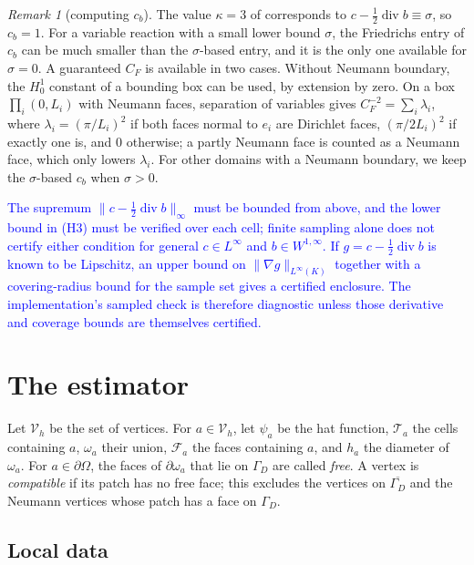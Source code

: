 \documentclass[11pt]{article}
\newcommand{\rev}[1]{\textcolor{blue}{#1}}
\newcommand{\dv}{\operatorname{div}}
\theoremstyle{plain}
\theoremstyle{remark}
\newtheorem{remark}[theorem]{Remark}
\numberwithin{equation}{section}
\begin{document}
\begin{remark}[computing $c_b$]\label{rem:CF}
The value $\kappa=3$ of \cite{EM16} corresponds to $c-\frac12\dv b\equiv\sigma$, so $c_b=1$. For a
variable reaction with a small lower bound $\sigma$, the Friedrichs entry of $c_b$ can be much smaller
than the $\sigma$-based entry, and it is the only one available for $\sigma=0$. A guaranteed $C_F$ is
available in two cases. Without Neumann boundary, the $H^1_0$ constant of a bounding box can be
used, by extension by zero. On a box $\prod_i(0,L_i)$ with Neumann faces, separation of variables
gives $C_F^{-2}=\sum_i\lambda_i$, where $\lambda_i=(\pi/L_i)^2$ if both faces normal to $e_i$ are
Dirichlet faces, $(\pi/2L_i)^2$ if exactly one is, and $0$ otherwise; a partly Neumann face is
counted as a Neumann face, which only lowers $\lambda_i$. For other domains with a Neumann boundary, we keep the $\sigma$-based
$c_b$ when $\sigma>0$.

\rev{The supremum $\|c-\frac12\dv b\|_\infty$ must be bounded from above, and the lower bound in
(H3) must be verified over each cell; finite sampling alone does not certify either condition for
general $c\in L^\infty$ and $b\in W^{1,\infty}$. If
$g=c-\frac12\dv b$ is known to be Lipschitz, an upper bound on
$\|\nabla g\|_{L^\infty(K)}$ together with a covering-radius bound for the sample set gives a
certified enclosure. The implementation's sampled check is therefore diagnostic unless those
derivative and coverage bounds are themselves certified.}
\end{remark}

\section{The estimator}\label{sec:estimator}

Let $\mathcal V_h$ be the set of vertices. For $a\in\mathcal V_h$, let $\psi_a$ be the hat function,
$\mathcal T_a$ the cells containing $a$, $\omega_a$ their union, $\mathcal F_a$ the faces containing
$a$, and $h_a$ the diameter of $\omega_a$. For $a\in\partial\Omega$, the faces of $\partial\omega_a$
that lie on $\Gamma_D$ are called \emph{free}. A vertex is \emph{compatible} if its patch has no free
face; this excludes the vertices on $\overline{\Gamma_D}$ and the Neumann vertices whose patch has a
face on $\Gamma_D$.

\subsection{Local data}
\end{document}
